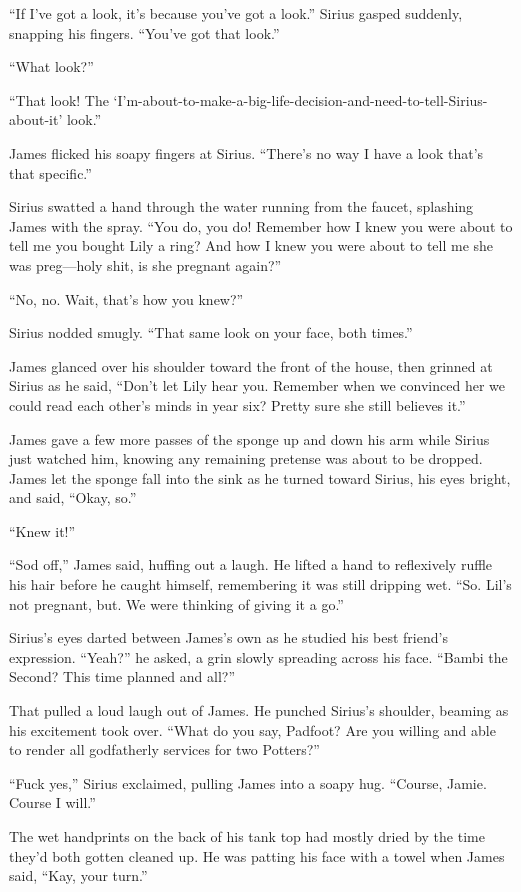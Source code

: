 “If I’ve got a look, it’s because you’ve got a look.” Sirius gasped suddenly, snapping his fingers. “You’ve got that look.”

“What look?”

“That look! The ‘I’m-about-to-make-a-big-life-decision-and-need-to-tell-Sirius-about-it’ look.”

James flicked his soapy fingers at Sirius. “There’s no way I have a look that’s that specific.”

Sirius swatted a hand through the water running from the faucet, splashing James with the spray. “You do, you do! Remember how I knew you were about to tell me you bought Lily a ring? And how I knew you were about to tell me she was preg—holy shit, is she pregnant again?”

“No, no. Wait, that’s how you knew?”

Sirius nodded smugly. “That same look on your face, both times.”

James glanced over his shoulder toward the front of the house, then grinned at Sirius as he said, “Don’t let Lily hear you. Remember when we convinced her we could read each other’s minds in year six? Pretty sure she still believes it.”

James gave a few more passes of the sponge up and down his arm while Sirius just watched him, knowing any remaining pretense was about to be dropped. James let the sponge fall into the sink as he turned toward Sirius, his eyes bright, and said, “Okay, so.”

“Knew it!”

“Sod off,” James said, huffing out a laugh. He lifted a hand to reflexively ruffle his hair before he caught himself, remembering it was still dripping wet. “So. Lil’s not pregnant, but. We were thinking of giving it a go.”

Sirius’s eyes darted between James’s own as he studied his best friend’s expression. “Yeah?” he asked, a grin slowly spreading across his face. “Bambi the Second? This time planned and all?”

That pulled a loud laugh out of James. He punched Sirius’s shoulder, beaming as his excitement took over. “What do you say, Padfoot? Are you willing and able to render all godfatherly services for two Potters?”

“Fuck yes,” Sirius exclaimed, pulling James into a soapy hug. “Course, Jamie. Course I will.”

The wet handprints on the back of his tank top had mostly dried by the time they’d both gotten cleaned up. He was patting his face with a towel when James said, “Kay, your turn.”

